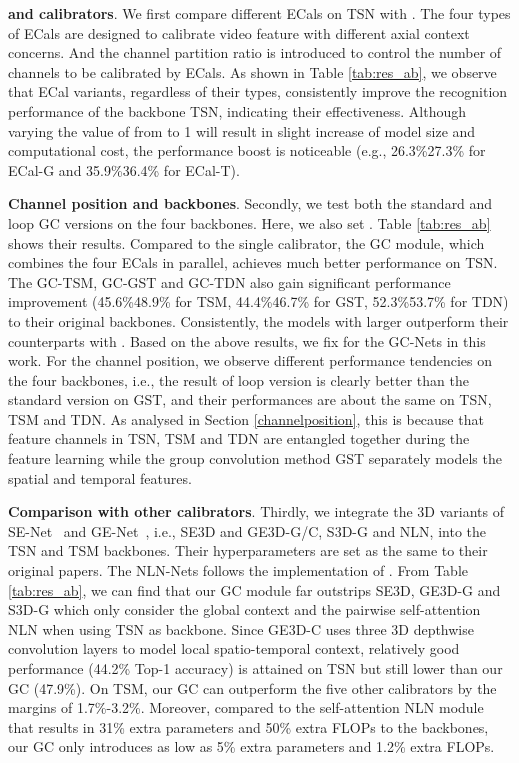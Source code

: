 {\bf  and calibrators}. We first compare different ECals on TSN with . The four types of ECals are designed to calibrate video feature with different axial context concerns. And the channel partition ratio  is introduced to control the number of channels to be calibrated by ECals. As shown in Table \ref{tab:res_ab}, we observe that ECal variants, regardless of their types, consistently improve the recognition performance of the backbone TSN, indicating their effectiveness. Although varying the value of  from  to 1 will result in slight increase of model size and computational cost, the performance boost is noticeable (e.g., 26.3\%27.3\% for ECal-G and 35.9\%36.4\% for ECal-T). 

{\bf Channel position and backbones}. Secondly, we test both the standard and loop GC versions on the four backbones. Here, we also set . Table \ref{tab:res_ab} shows their results. Compared to the single calibrator, the GC module, which combines the four ECals in parallel, achieves much better performance on TSN. The GC-TSM, GC-GST and GC-TDN also gain significant performance improvement (45.6\%48.9\% for TSM, 44.4\%46.7\% for GST, 52.3\%53.7\% for TDN) to their original backbones. Consistently, the models with larger  outperform their counterparts with . Based on the above results, we fix  for the GC-Nets in this work. For the channel position, we observe different performance tendencies on the four backbones, i.e., the result of loop version is clearly better than the standard version on GST, and their performances are about the same on TSN, TSM and TDN. As analysed in Section \ref{channelposition}, this is because that feature channels in TSN, TSM and TDN are entangled together during the feature learning while the group convolution method GST separately models the spatial and temporal features. 

{\bf Comparison with other calibrators}. Thirdly, we integrate the 3D variants of SE-Net~\cite{hu2018squeeze} and GE-Net~\cite{hu2018gather}, i.e., SE3D and GE3D-G/C, S3D-G and NLN, into the TSN and TSM backbones. Their hyperparameters are set as the same to their original papers. The NLN-Nets follows the implementation of \cite{lin2019tsm}. From Table \ref{tab:res_ab}, we can find that our GC module far outstrips SE3D, GE3D-G and S3D-G which only consider the global context and the pairwise self-attention NLN when using TSN as backbone. Since GE3D-C uses three 3D depthwise convolution layers to model local spatio-temporal context, relatively good performance (44.2\% Top-1 accuracy) is attained on TSN but still lower than our GC (47.9\%). On TSM, our GC can outperform the five other calibrators by the margins of 1.7\%-3.2\%. Moreover, compared to the self-attention NLN module that results in 31\% extra parameters and 50\% extra FLOPs to the backbones, our GC only introduces as low as 5\% extra parameters and 1.2\% extra FLOPs.

